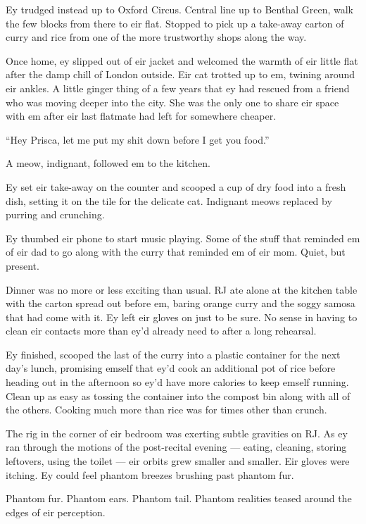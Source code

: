 Ey trudged instead up to Oxford Circus. Central line up to Benthal Green, walk the few blocks from there to eir flat. Stopped to pick up a take-away carton of curry and rice from one of the more trustworthy shops along the way.

Once home, ey slipped out of eir jacket and welcomed the warmth of eir little flat after the damp chill of London outside. Eir cat trotted up to em, twining around eir ankles. A little ginger thing of a few years that ey had rescued from a friend who was moving deeper into the city. She was the only one to share eir space with em after eir last flatmate had left for somewhere cheaper.

``Hey Prisca, let me put my shit down before I get you food.''

A meow, indignant, followed em to the kitchen.

Ey set eir take-away on the counter and scooped a cup of dry food into a fresh dish, setting it on the tile for the delicate cat. Indignant meows replaced by purring and crunching.

Ey thumbed eir phone to start music playing. Some of the stuff that reminded em of eir dad to go along with the curry that reminded em of eir mom. Quiet, but present.

Dinner was no more or less exciting than usual. RJ ate alone at the kitchen table with the carton spread out before em, baring orange curry and the soggy samosa that had come with it. Ey left eir gloves on just to be sure. No sense in having to clean eir contacts more than ey'd already need to after a long rehearsal.

Ey finished, scooped the last of the curry into a plastic container for the next day's lunch, promising emself that ey'd cook an additional pot of rice before heading out in the afternoon so ey'd have more calories to keep emself running. Clean up as easy as tossing the container into the compost bin along with all of the others. Cooking much more than rice was for times other than crunch.

The rig in the corner of eir bedroom was exerting subtle gravities on RJ. As ey ran through the motions of the post-recital evening — eating, cleaning, storing leftovers, using the toilet — eir orbits grew smaller and smaller. Eir gloves were itching. Ey could feel phantom breezes brushing past phantom fur.

Phantom fur. Phantom ears. Phantom tail. Phantom realities teased around the edges of eir perception.

